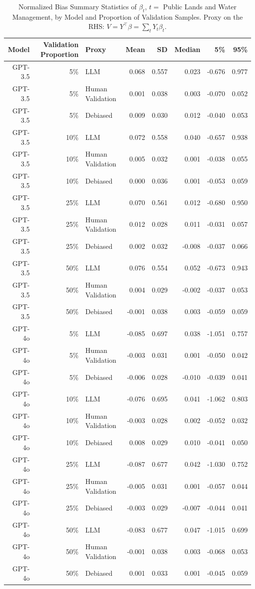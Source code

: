 \begin{table}

\caption{\label{tab:unnamed-chunk-1}Normalized Bias Summary Statistics of $\beta_{t}$, $t=$ Public Lands and Water Management, by Model and Proportion of Validation Samples.
      Proxy on the RHS: $V = Y^\top \beta = \sum_{t} Y_t \beta_t$.}
\centering
\begin{tabular}[t]{rrlrrrrr}
\toprule
Model & Validation Proportion & Proxy & Mean & SD & Median & 5\% & 95\%\\
\midrule
GPT-3.5 & 5\% & LLM & 0.068 & 0.557 & 0.023 & -0.676 & 0.977\\
GPT-3.5 & 5\% & Human Validation & 0.001 & 0.038 & 0.003 & -0.070 & 0.052\\
GPT-3.5 & 5\% & Debiased & 0.009 & 0.030 & 0.012 & -0.040 & 0.053\\
GPT-3.5 & 10\% & LLM & 0.072 & 0.558 & 0.040 & -0.657 & 0.938\\
GPT-3.5 & 10\% & Human Validation & 0.005 & 0.032 & 0.001 & -0.038 & 0.055\\
GPT-3.5 & 10\% & Debiased & 0.000 & 0.036 & 0.001 & -0.053 & 0.059\\
GPT-3.5 & 25\% & LLM & 0.070 & 0.561 & 0.012 & -0.680 & 0.950\\
GPT-3.5 & 25\% & Human Validation & 0.012 & 0.028 & 0.011 & -0.031 & 0.057\\
GPT-3.5 & 25\% & Debiased & 0.002 & 0.032 & -0.008 & -0.037 & 0.066\\
GPT-3.5 & 50\% & LLM & 0.076 & 0.554 & 0.052 & -0.673 & 0.943\\
GPT-3.5 & 50\% & Human Validation & 0.004 & 0.029 & -0.002 & -0.037 & 0.053\\
GPT-3.5 & 50\% & Debiased & -0.001 & 0.038 & 0.003 & -0.059 & 0.059\\
GPT-4o & 5\% & LLM & -0.085 & 0.697 & 0.038 & -1.051 & 0.757\\
GPT-4o & 5\% & Human Validation & -0.003 & 0.031 & 0.001 & -0.050 & 0.042\\
GPT-4o & 5\% & Debiased & -0.006 & 0.028 & -0.010 & -0.039 & 0.041\\
GPT-4o & 10\% & LLM & -0.076 & 0.695 & 0.041 & -1.062 & 0.803\\
GPT-4o & 10\% & Human Validation & -0.003 & 0.028 & 0.002 & -0.052 & 0.032\\
GPT-4o & 10\% & Debiased & 0.008 & 0.029 & 0.010 & -0.041 & 0.050\\
GPT-4o & 25\% & LLM & -0.087 & 0.677 & 0.042 & -1.030 & 0.752\\
GPT-4o & 25\% & Human Validation & -0.005 & 0.031 & 0.001 & -0.057 & 0.044\\
GPT-4o & 25\% & Debiased & -0.003 & 0.029 & -0.007 & -0.044 & 0.041\\
GPT-4o & 50\% & LLM & -0.083 & 0.677 & 0.047 & -1.015 & 0.699\\
GPT-4o & 50\% & Human Validation & -0.001 & 0.038 & 0.003 & -0.068 & 0.053\\
GPT-4o & 50\% & Debiased & 0.001 & 0.033 & 0.001 & -0.045 & 0.059\\
\bottomrule
\end{tabular}
\end{table}
